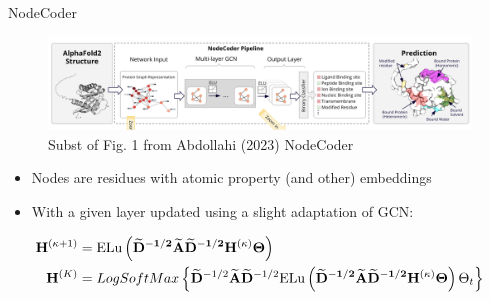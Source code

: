 \documentclass{beamer}
\newcommand{\NodeRepMat}{\mathbf{H}}
\newcommand{\DegMat}{\mathbf{D}}
\newcommand{\iter}{\kappa}
\newcommand{\Iter}{K}
\newcommand{\AdjMat}{\mathbf{A}}
\begin{document}
\begin{frame}{NodeCoder}
    \begin{figure}
        \centering 
        \includegraphics[scale=0.3]{Fig1_NodeCoder.png}
        \caption{Subst of Fig. 1 from Abdollahi (2023) NodeCoder \cite{abdollahi_nodecoder_2023}}
    \end{figure}

    \begin{itemize}
        \item Nodes are residues with atomic property (and other) embeddings
        \item With a given layer updated using a slight adaptation of GCN: 
    \end{itemize}
    \begin{align*}
        \NodeRepMat^{(\iter+1)} 
        &=
        \text{ELu}
        \left( 
            \mathbf{
            \widetilde{\DegMat}^{-1/2}
            \widetilde{\AdjMat}
            \widetilde{\DegMat}^{-1/2}  
            \NodeRepMat^{(\iter)}
            \Theta 
            }            
        \right)
    \\
        \NodeRepMat^{(\Iter)} 
        &=
        LogSoftMax
        \left\{
        \widetilde{\DegMat}^{-1/2}
        \widetilde{\AdjMat}
        \widetilde{\DegMat}^{-1/2}  
        \text{ELu}
        \left( 
            \mathbf{
            \widetilde{\DegMat}^{-1/2}
            \widetilde{\AdjMat}
            \widetilde{\DegMat}^{-1/2}  
            \NodeRepMat^{(\iter)}
            \Theta 
            }            
        \right)
        \Theta_t
        \right\}
    \end{align*}
\end{frame}
\end{document}

